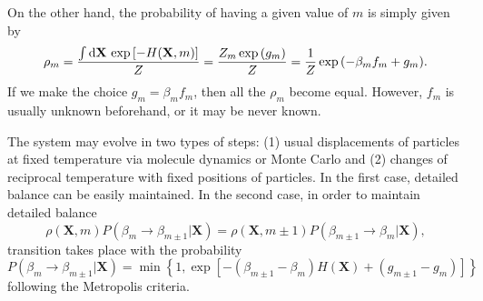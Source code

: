On the other hand, the probability of having a given value of $m$ is simply given by
\begin{equation}
    \rho_m=\frac{\int\mathop{}\!\mathrm{d} \mathbf{X}\, \exp{\left[-H(\mathbf{X},m)\right]}}{Z}=\frac{Z_m\exp{(g_m)}}{Z}=\frac{1}{Z}\exp{(-\beta_m f_m+g_m)}.
\end{equation}
If we make the choice $g_m=\beta_m f_m$, then all the $\rho_m$ become equal. However, $f_m$ is usually unknown beforehand, or it may be never known.

The system may evolve in two types of steps: (1) usual displacements of particles at fixed temperature via molecule dynamics or Monte Carlo and (2) changes of reciprocal temperature with fixed positions of particles. In the first case, detailed balance can be easily maintained. In the second case, in order to maintain detailed balance
\begin{equation}
    \rho(\mathbf{X},m)P(\beta_m\to \beta_{m\pm 1}|\mathbf{X})=\rho(\mathbf{X},m\pm 1)P(\beta_{m\pm 1}\to \beta_{m}|\mathbf{X}),
\end{equation}
transition takes place with the probability
\begin{equation}
    P(\beta_m\to \beta_{m\pm 1}|\mathbf{X})=\min{\left\{1,\exp{\left[-(\beta_{m\pm1}-\beta_m)H(\mathbf{X})+(g_{m\pm1}-g_m)\right]}\right\}}
\end{equation}
following the Metropolis criteria.